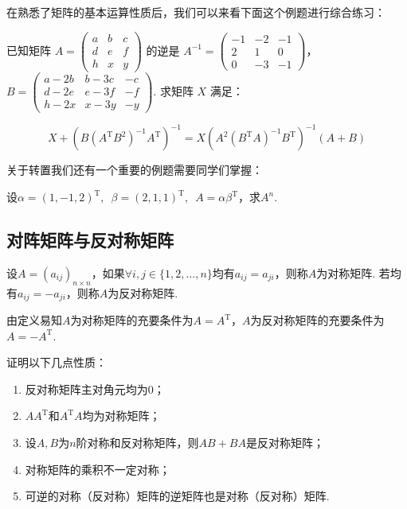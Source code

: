 在熟悉了矩阵的基本运算性质后，我们可以来看下面这个例题进行综合练习：
\begin{example}
    已知矩阵 $A=\begin{pmatrix}a & b & c \\ d & e & f \\ h & x & y\end{pmatrix}$ 的逆是 $A^{-1}=\begin{pmatrix}-1 & -2 & -1 \\ 2 & 1 & 0 \\ 0 & -3 & -1\end{pmatrix}$，\\
    $B=\begin{pmatrix}a-2b & b-3c & -c \\ d-2e & e-3f & -f \\ h-2x & x-3y & -y\end{pmatrix}$. 求矩阵 $X$ 满足：

    \[X+\left(B(A^\mathrm{T}B^2)^{-1}A^\mathrm{T}\right)^{-1}=X\left(A^2(B^\mathrm{T}A)^{-1}B^\mathrm{T}\right)^{-1}(A+B)\]
\end{example}

\begin{solution}

\end{solution}

关于转置我们还有一个重要的例题需要同学们掌握：
\begin{example}\label{ex:9:转置求幂}
    设$\alpha=(1,-1,2)^\mathrm{T},\enspace\beta=(2,1,1)^\mathrm{T},\enspace A=\alpha\beta^\mathrm{T}$，求$A^n$.
\end{example}

\subsection{对阵矩阵与反对称矩阵}

\begin{definition}
    设$A=(a_{ij})_{n \times n}$，如果$\forall i,j\in\{1,2,\ldots,n\}$均有$a_{ij}=a_{ji}$，则称$A$为对称矩阵. 若均有$a_{ij}=-a_{ji}$，则称$A$为反对称矩阵.
\end{definition}
由定义易知$A$为对称矩阵的充要条件为$A=A^\mathrm{T}$，$A$为反对称矩阵的充要条件为$A=-A^\mathrm{T}$.
\begin{example}
    证明以下几点性质：
    \begin{enumerate}
        \item 反对称矩阵主对角元均为0；

        \item $AA^\mathrm{T}$和$A^\mathrm{T}A$均为对称矩阵；

        \item 设$A,B$为$n$阶对称和反对称矩阵，则$AB+BA$是反对称矩阵；

        \item 对称矩阵的乘积不一定对称；

        \item 可逆的对称（反对称）矩阵的逆矩阵也是对称（反对称）矩阵.
    \end{enumerate}
\end{example}

